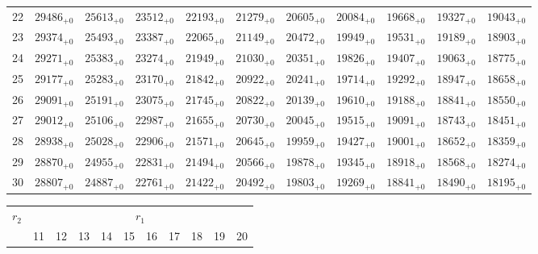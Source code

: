 \documentclass[10pt, a4paper]{article}
\begin{document}
\begin{center}
\begin{tabular}{c || c c c c c | c c c c c}
        22 & \({29486}_{+0}\) & \({25613}_{+0}\) & \({23512}_{+0}\) & \({22193}_{+0}\) & \({21279}_{+0}\) & \({20605}_{+0}\) & \({20084}_{+0}\) & \({19668}_{+0}\) & \({19327}_{+0}\) & \({19043}_{+0}\)\\
        23 & \({29374}_{+0}\) & \({25493}_{+0}\) & \({23387}_{+0}\) & \({22065}_{+0}\) & \({21149}_{+0}\) & \({20472}_{+0}\) & \({19949}_{+0}\) & \({19531}_{+0}\) & \({19189}_{+0}\) & \({18903}_{+0}\)\\
        24 & \({29271}_{+0}\) & \({25383}_{+0}\) & \({23274}_{+0}\) & \({21949}_{+0}\) & \({21030}_{+0}\) & \({20351}_{+0}\) & \({19826}_{+0}\) & \({19407}_{+0}\) & \({19063}_{+0}\) & \({18775}_{+0}\)\\
        25 & \({29177}_{+0}\) & \({25283}_{+0}\) & \({23170}_{+0}\) & \({21842}_{+0}\) & \({20922}_{+0}\) & \({20241}_{+0}\) & \({19714}_{+0}\) & \({19292}_{+0}\) & \({18947}_{+0}\) & \({18658}_{+0}\)\\
        \hline
        26 & \({29091}_{+0}\) & \({25191}_{+0}\) & \({23075}_{+0}\) & \({21745}_{+0}\) & \({20822}_{+0}\) & \({20139}_{+0}\) & \({19610}_{+0}\) & \({19188}_{+0}\) & \({18841}_{+0}\) & \({18550}_{+0}\)\\
        27 & \({29012}_{+0}\) & \({25106}_{+0}\) & \({22987}_{+0}\) & \({21655}_{+0}\) & \({20730}_{+0}\) & \({20045}_{+0}\) & \({19515}_{+0}\) & \({19091}_{+0}\) & \({18743}_{+0}\) & \({18451}_{+0}\)\\
        28 & \({28938}_{+0}\) & \({25028}_{+0}\) & \({22906}_{+0}\) & \({21571}_{+0}\) & \({20645}_{+0}\) & \({19959}_{+0}\) & \({19427}_{+0}\) & \({19001}_{+0}\) & \({18652}_{+0}\) & \({18359}_{+0}\)\\
        29 & \({28870}_{+0}\) & \({24955}_{+0}\) & \({22831}_{+0}\) & \({21494}_{+0}\) & \({20566}_{+0}\) & \({19878}_{+0}\) & \({19345}_{+0}\) & \({18918}_{+0}\) & \({18568}_{+0}\) & \({18274}_{+0}\)\\
        30 & \({28807}_{+0}\) & \({24887}_{+0}\) & \({22761}_{+0}\) & \({21422}_{+0}\) & \({20492}_{+0}\) & \({19803}_{+0}\) & \({19269}_{+0}\) & \({18841}_{+0}\) & \({18490}_{+0}\) & \({18195}_{+0}\)\\
        \hline
    \end{tabular}
    \pagebreak
    \begin{tabular}{c || c c c c c | c c c c c}
        \multirow{2}{*}{\(r_2\)} & \multicolumn{10}{c}{\(r_1\)} \\
        & 11 & 12 & 13 & 14 & 15 & 16 & 17 & 18 & 19 & 20\\
        \hline\hline

\end{tabular}
\end{center}
\end{document}
